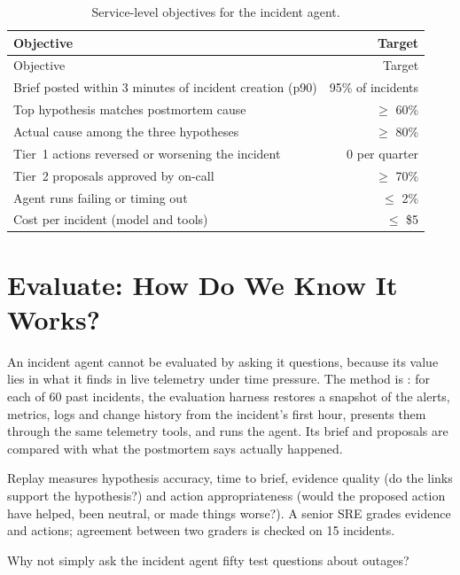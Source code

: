 \begingroup
\small
\begin{longtable}{@{}lr@{}}
\caption{Service-level objectives for the incident agent.}\label{tab:inc-slo}\\
\toprule
\rowcolor{coHead} Objective & Target \\
\midrule
\endfirsthead
\toprule
\rowcolor{coHead} Objective & Target \\
\midrule
\endhead
Brief posted within 3 minutes of incident creation (p90) & 95\% of incidents \\
Top hypothesis matches postmortem cause & $\ge$ 60\% \\
Actual cause among the three hypotheses & $\ge$ 80\% \\
Tier~1 actions reversed or worsening the incident & 0 per quarter \\
Tier~2 proposals approved by on-call & $\ge$ 70\% \\
Agent runs failing or timing out & $\le$ 2\% \\
Cost per incident (model and tools) & $\le$ \$5 \\
\bottomrule
\end{longtable}
\endgroup

\section{Evaluate: How Do We Know It Works?}
\label{sec:inc-evaluate}

An incident agent cannot be evaluated by asking it questions, because its value lies in what it finds in live telemetry under time pressure. The method is : for each of 60 past incidents, the evaluation harness restores a snapshot of the alerts, metrics, logs and change history from the incident's first hour, presents them through the same telemetry tools, and runs the agent. Its brief and proposals are compared with what the postmortem says actually happened.

Replay measures hypothesis accuracy, time to brief, evidence quality (do the links support the hypothesis?) and action appropriateness (would the proposed action have helped, been neutral, or made things worse?). A senior SRE grades evidence and actions; agreement between two graders is checked on 15 incidents.

\begin{quickcheck}
Why not simply ask the incident agent fifty test questions about outages?
\end{quickcheck}

